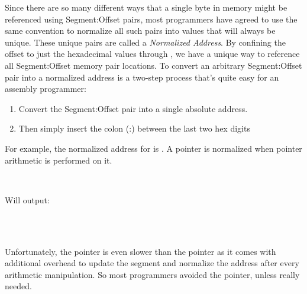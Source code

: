 \documentclass[book.tex]{subfiles}
\begin{document}
\par
Since there are so many different ways that a single byte in memory might be referenced using Segment:Offset pairs, most programmers have agreed to use the same convention to normalize all such pairs into values that will always be unique. These unique pairs are called a \textit{Normalized Address}. 
By confining the offset to just the hexadecimal values  through , we have a unique way to reference all Segment:Offset memory pair locations. To convert an arbitrary Segment:Offset pair into a normalized address is a two-step process that's quite easy for an assembly programmer:\\

\begin{enumerate}
  \item Convert the Segment:Offset pair into a single absolute address.
  \item Then simply insert the colon (:) between the last two hex digits
\end{enumerate}

For example, the normalized address for  is . A  pointer is normalized when pointer arithmetic is performed on it. \\
\par
\begin{minipage}{\textwidth}
 \par
 \end{minipage}\\
\par
Will output:\\
\par
\begin{minipage}{\textwidth}
 \par
 \end{minipage}\\
\par



\\

Unfortunately, the  pointer is even slower than the  pointer as it comes with additional overhead to update the segment and normalize the address after every arithmetic manipulation. So most programmers avoided the  pointer, unless really needed.\\
\end{document}

